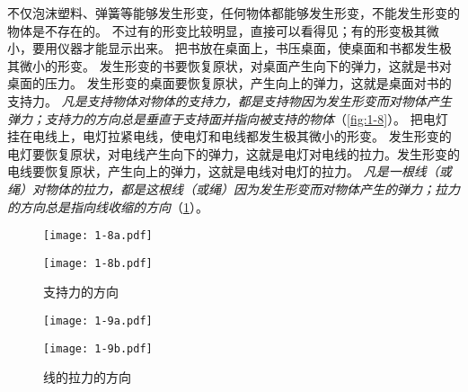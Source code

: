 不仅泡沫塑料、弹簧等能够发生形变，任何物体都能够发生形变，不能发生形变的物体是不存在的。
不过有的形变比较明显，直接可以看得见；有的形变极其微小，要用仪器才能显示出来。
把书放在桌面上，书压桌面，使桌面和书都发生极其微小的形变。
发生形变的书要恢复原状，对桌面产生向下的弹力，这就是书对桌面的压力。
发生形变的桌面要恢复原状，产生向上的弹力，这就是桌面对书的支持力。
\emph{凡是支持物体对物体的支持力，都是支持物因为发生形变而对物体产生弹力；支持力的方向总是垂直于支持面并指向被支持的物体}（\cref{fig:1-8}）。
把电灯挂在电线上，电灯拉紧电线，使电灯和电线都发生极其微小的形变。
发生形变的电灯要恢复原状，对电线产生向下的弹力，这就是电灯对电线的拉力。发生形变的电线要恢复原状，产生向上的弹力，这就是电线对电灯的拉力。
\emph{凡是一根线（或绳）对物体的拉力，都是这根线（或绳）因为发生形变而对物体产生的弹力；拉力的方向总是指向线收缩的方向}（\cref{fig:1-9}）。

\begin{figure}
\begin{minipage}[b]{0.6\linewidth}
  \begin{minipage}{0.5\linewidth}\centering
    \texttt{[image: 1-8a.pdf]}
    \subcaption{}\label{fig:1-8a}
  \end{minipage}%
  \begin{minipage}{0.5\linewidth}\centering
    \texttt{[image: 1-8b.pdf]}
    \subcaption{}\label{fig:1-8b}
  \end{minipage}
  \caption{支持力的方向}\label{fig:1-8}
\end{minipage}%
\begin{minipage}[b]{0.4\linewidth}
  \begin{minipage}{0.25\linewidth}
    \texttt{[image: 1-9a.pdf]}
    \subcaption{}\label{fig:1-9a}
  \end{minipage}%
  \begin{minipage}{0.75\linewidth}
    \texttt{[image: 1-9b.pdf]}
    \subcaption{}\label{fig:1-9b}
  \end{minipage}%
  \caption{线的拉力的方向}\label{fig:1-9}
\end{minipage}
\end{figure}

